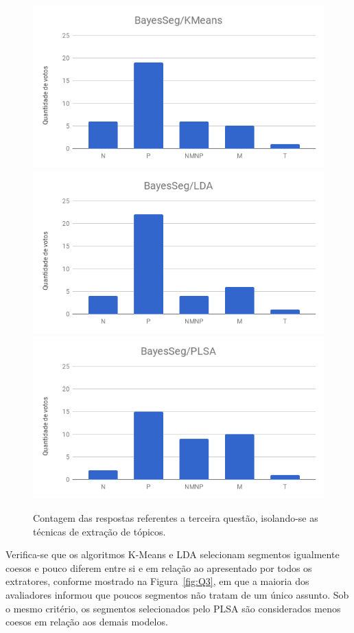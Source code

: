\begin{figure}[!h] \centering     %

		\includegraphics[width=.31\textwidth]{conteudo/capitulos/figs/figuras-experimento/t1q3.png}
		\includegraphics[width=.31\textwidth]{conteudo/capitulos/figs/figuras-experimento/t2q3.png}
		\includegraphics[width=.31\textwidth]{conteudo/capitulos/figs/figuras-experimento/t3q3.png}

	\caption{Contagem das respostas referentes a terceira questão, isolando-se as técnicas de extração de tópicos.}
	\label{fig:influenciaExtSegQ3}
\end{figure}

Verifica-se que os algoritmos K-Means e LDA selecionam segmentos igualmente coesos e pouco diferem entre si e em relação ao apresentado por todos os extratores, conforme mostrado na Figura~\ref{fig:Q3}, em que a maioria dos avaliadores informou que poucos segmentos não tratam de um único assunto. 
Sob o mesmo critério, os segmentos selecionados pelo PLSA são considerados menos coesos em relação aos demais modelos. 






